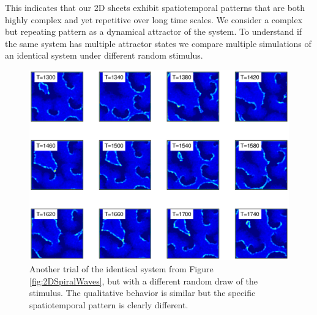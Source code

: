 This indicates that our 2D sheets exhibit spatiotemporal patterns that are both highly complex and yet repetitive over long time scales.
We consider a complex but repeating pattern as a dynamical attractor of the system.
To understand if the same system has multiple attractor states we compare multiple simulations of an identical system under different random stimulus.
\begin{figure}[!htb]
 \caption{ Another trial of the identical system from Figure \ref{fig:2DSpiralWaves}, but with a different random draw of the stimulus.
           The qualitative behavior is similar but the specific spatiotemporal pattern is clearly different.}
 \label{fig:2DSpiralWaves_SecondTrial}
 \centering
   \includegraphics[width=\textwidth]{fig/SpiralWaves2D_K6_kappa0p1_M4_SecondTrial}
\end{figure}
\FloatBarrier


